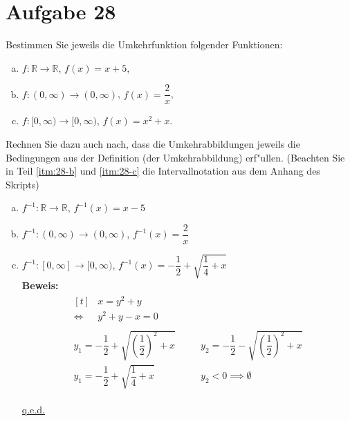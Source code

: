 \documentclass[10pt, oneside]{article}
\begin{document}
\section{Aufgabe 28}

Bestimmen Sie jeweils die Umkehrfunktion folgender Funktionen:
\begin{enumerate}[(a)]
    \item $f : \mathbb{R} \rightarrow \mathbb{R}$, $f(x) = x + 5$,
    \item \label{itm:28-b} $f : (0, \infty) \rightarrow (0, \infty)$, $f(x) = \dfrac{2}{x}$,
    \item \label{itm:28-c} $f : [0, \infty) \rightarrow [0, \infty)$, $f(x) = x^2 + x$.
\end{enumerate}
Rechnen Sie dazu auch nach, dass die Umkehrabbildungen jeweils die Bedingungen
aus der Definition (der Umkehrabbildung) erf"ullen. (Beachten Sie in Teil
\ref{itm:28-b} und \ref{itm:28-c} die Intervallnotation aus dem Anhang des Skripts)

\begin{enumerate}[(a)]
    \item $f^{-1} : \mathbb{R} \rightarrow \mathbb{R}$, $f^{-1}(x) = x - 5$
    \item $f^{-1} : (0, \infty) \rightarrow (0, \infty)$, $f^{-1}(x) = \dfrac{2}{x}$
    \item $f^{-1} : [0, \infty] \rightarrow [0, \infty)$, $f^{-1}(x) = -\dfrac{1}{2} + \sqrt{\dfrac{1}{4} + x}$ \\[5pt]
        \textbf{Beweis:}\\[2pt]
        \begin{equation*}
            \begin{gathered}
                \begin{aligned}[t]
                          &x = y^2 + y \\[5pt]
                    \iff\ &y^2 + y - x = 0
                \end{aligned} \\[10pt]
                \begin{array}{lcl}
                    y_{1} = - \dfrac{1}{2} + \sqrt{\left(\dfrac{1}{2}\right)^2 + x} &\quad& y_{2} = - \dfrac{1}{2} - \sqrt{\left(\dfrac{1}{2}\right)^2 + x} \\[15pt]
                    y_1   = - \dfrac{1}{2} + \sqrt{\dfrac{1}{4} + x} && y_{2} < 0 \implies \emptyset
                \end{array}
            \end{gathered}
        \end{equation*}
        \vspace{3pt}
        \begin{center}
            \underline{q.e.d.}
        \end{center}
\end{enumerate}
\end{document}
